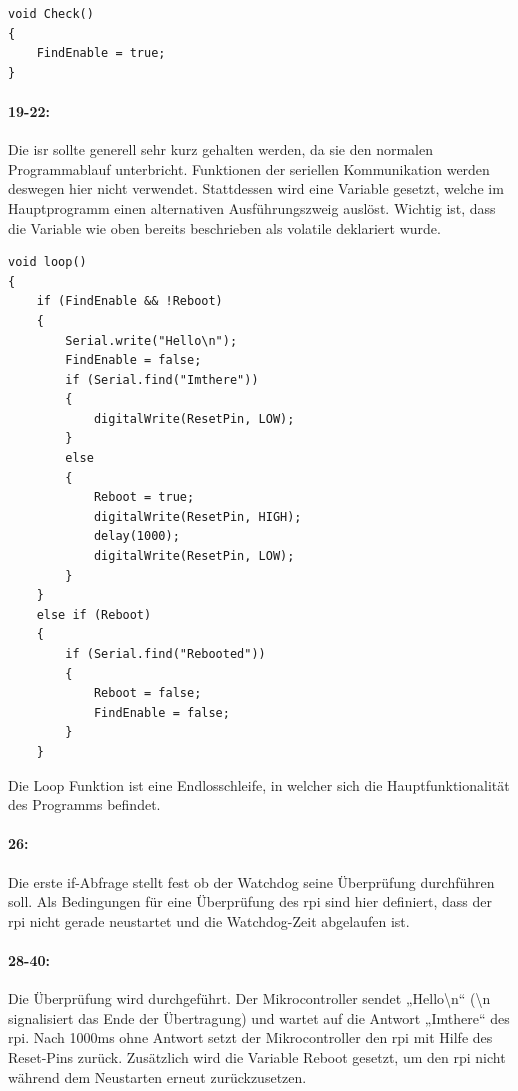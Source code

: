 \begin{verbatim}
void Check()
{
    FindEnable = true;
}
\end{verbatim}

\paragraph{19-22:}
Die \ac{isr} sollte generell sehr kurz gehalten werden, da sie den normalen Programmablauf unterbricht.
Funktionen der seriellen Kommunikation werden deswegen hier nicht verwendet.
Stattdessen wird eine Variable gesetzt, welche im Hauptprogramm einen alternativen Ausführungszweig auslöst.
Wichtig ist, dass die Variable wie oben bereits beschrieben als volatile deklariert wurde.

\begin{verbatim}
void loop()
{
    if (FindEnable && !Reboot)
    {
        Serial.write("Hello\n");
        FindEnable = false;
        if (Serial.find("Imthere"))
        {
            digitalWrite(ResetPin, LOW);
        }
        else
        {
            Reboot = true;
            digitalWrite(ResetPin, HIGH);
            delay(1000);
            digitalWrite(ResetPin, LOW);
        }
    }
    else if (Reboot)
    {
        if (Serial.find("Rebooted"))
        {
            Reboot = false;
            FindEnable = false;
        }
    }
\end{verbatim}
Die Loop Funktion ist eine Endlosschleife, in welcher sich die Hauptfunktionalität des Programms befindet.

\paragraph{26:}
Die erste if-Abfrage stellt fest ob der Watchdog seine Überprüfung durchführen soll.
Als Bedingungen für eine Überprüfung des \ac{rpi} sind hier definiert, dass der \ac{rpi} nicht gerade neustartet und die Watchdog-Zeit abgelaufen ist.

\paragraph{28-40:}
Die Überprüfung wird durchgeführt.
Der Mikrocontroller sendet „Hello\textbackslash n“ (\textbackslash n signalisiert das Ende der Übertragung) und wartet auf die Antwort „Imthere“ des \ac{rpi}.
Nach 1000ms ohne Antwort setzt der Mikrocontroller den \ac{rpi} mit Hilfe des Reset-Pins zurück.
Zusätzlich wird die Variable Reboot gesetzt, um den \ac{rpi} nicht während dem Neustarten erneut zurückzusetzen.

